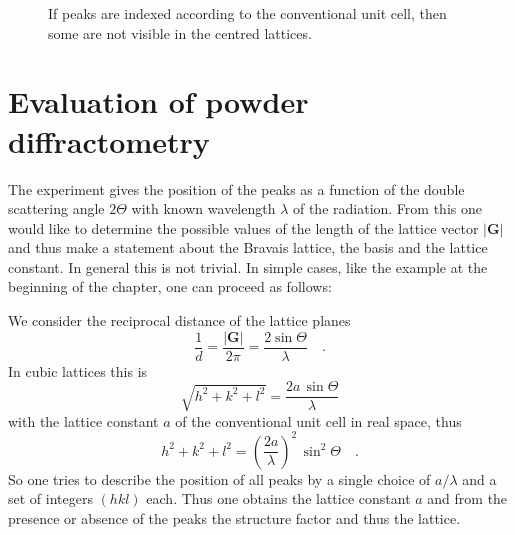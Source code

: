 \begin{figure}
  \caption{If peaks are indexed according to the conventional unit cell, then some are not visible in the centred lattices. }
\end{figure}


\section{Evaluation of powder diffractometry}

The experiment gives the position of the peaks as a function of the double scattering angle $2\Theta$ with known wavelength $\lambda$ of the radiation. From this one would like to determine the possible values of the length of the lattice vector $|\mathbf{G}|$ and thus make a statement about the Bravais lattice, the basis and the lattice constant. In general this is not trivial. In simple cases, like the example at the beginning of the chapter, one can proceed as follows:

We consider the reciprocal distance of the lattice planes
\begin{equation}
\frac{1}{d} = \frac{|\mathbf{G}|}{2 \pi} = \frac{2 \sin \Theta}{ \lambda}  \quad .
\end{equation}
In cubic lattices this is
\begin{equation}
 \sqrt{h^2 + k^2 + l^2} = \frac{2 a \, \sin \Theta}{ \lambda}
\end{equation}
with the lattice constant $a$ of the conventional unit cell in real space, thus 
\begin{equation}
 h^2 + k^2 + l^2 = \left(\frac{2 a }{ \lambda} \right)^2 \, \sin^2 \Theta \quad .
\end{equation}
So one tries to describe the position of all peaks by a single choice of $a/\lambda$ and a set of integers $(hkl)$ each. Thus one obtains the lattice constant $a$ and from the presence or absence of the peaks the structure factor and thus the lattice.




\printbibliography[segment=\therefsegment,heading=subbibliography]

